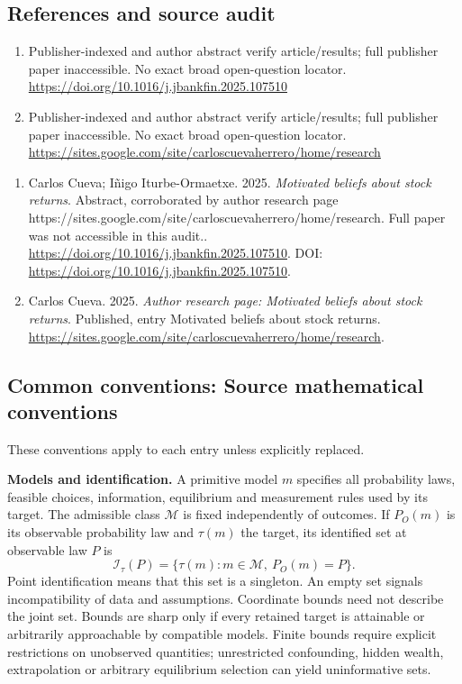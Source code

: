\documentclass[11pt,a4paper]{article}
\begin{document}
\subsection*{References and source audit}
\begin{enumerate}
\item Publisher-indexed and author abstract verify article/results; full publisher paper inaccessible. No exact broad open-question locator. \url{https://doi.org/10.1016/j.jbankfin.2025.107510}
\item Publisher-indexed and author abstract verify article/results; full publisher paper inaccessible. No exact broad open-question locator. \url{https://sites.google.com/site/carloscuevaherrero/home/research}
\end{enumerate}
\begin{enumerate}\raggedright
\item\hypertarget{definitions:source:30007587:1}{} Carlos Cueva; Iñigo Iturbe-Ormaetxe. 2025. \emph{Motivated beliefs about stock returns}. Abstract, corroborated by author research page https://sites.google.com/site/carloscuevaherrero/home/research. Full paper was not accessible in this audit..
\url{https://doi.org/10.1016/j.jbankfin.2025.107510}.
DOI: \url{https://doi.org/10.1016/j.jbankfin.2025.107510}.
\item\hypertarget{definitions:source:30007587:2}{} Carlos Cueva. 2025. \emph{Author research page: Motivated beliefs about stock returns}. Published, entry Motivated beliefs about stock returns.
\url{https://sites.google.com/site/carloscuevaherrero/home/research}.
\end{enumerate}

\subsection*{Common conventions: Source mathematical conventions}

These conventions apply to each entry unless explicitly replaced.

\textbf{Models and identification.} A primitive model \(m\) specifies all probability laws, feasible choices, information, equilibrium and measurement rules used by its target. The admissible class \(\mathcal M\) is fixed independently of outcomes. If \(P_O(m)\) is its observable probability law and \(\tau(m)\) the target, its identified set at observable law \(P\) is
\[
 \mathcal I_\tau(P)=\{\tau(m):m\in\mathcal M,\ P_O(m)=P\}.
\]
Point identification means that this set is a singleton. An empty set signals incompatibility of data and assumptions. Coordinate bounds need not describe the joint set. Bounds are sharp only if every retained target is attainable or arbitrarily approachable by compatible models. Finite bounds require explicit restrictions on unobserved quantities; unrestricted confounding, hidden wealth, extrapolation or arbitrary equilibrium selection can yield uninformative sets.
\end{document}
